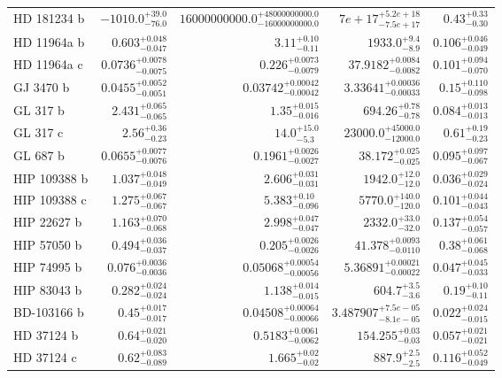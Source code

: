 \begin{longtable*}{lrrrr}
HD 181234 b & $-1010.0^{+39.0}_{-76.0}$ & $16000000000.0^{+48000000000.0}_{-16000000000.0}$ & $7e+17^{+5.2e+18}_{-7.5e+17}$ & $0.43^{+0.33}_{-0.30}$ \\ 
HD 11964a b & $0.603^{+0.048}_{-0.047}$ & $3.11^{+0.10}_{-0.11}$ & $1933.0^{+9.4}_{-8.9}$ & $0.106^{+0.046}_{-0.049}$ \\ 
HD 11964a c & $0.0736^{+0.0078}_{-0.0075}$ & $0.226^{+0.0073}_{-0.0079}$ & $37.9182^{+0.0084}_{-0.0082}$ & $0.101^{+0.094}_{-0.070}$ \\ 
GJ 3470 b & $0.0455^{+0.0052}_{-0.0051}$ & $0.03742^{+0.00042}_{-0.00042}$ & $3.33641^{+0.00036}_{-0.00033}$ & $0.15^{+0.110}_{-0.098}$ \\ 
GL 317 b & $2.431^{+0.065}_{-0.065}$ & $1.35^{+0.015}_{-0.016}$ & $694.26^{+0.78}_{-0.78}$ & $0.084^{+0.013}_{-0.013}$ \\ 
GL 317 c & $2.56^{+0.36}_{-0.23}$ & $14.0^{+15.0}_{-5.3}$ & $23000.0^{+45000.0}_{-12000.0}$ & $0.61^{+0.19}_{-0.23}$ \\ 
GL 687 b & $0.0655^{+0.0077}_{-0.0076}$ & $0.1961^{+0.0026}_{-0.0027}$ & $38.172^{+0.025}_{-0.025}$ & $0.095^{+0.097}_{-0.067}$ \\ 
HIP 109388 b & $1.037^{+0.048}_{-0.049}$ & $2.606^{+0.031}_{-0.031}$ & $1942.0^{+12.0}_{-12.0}$ & $0.036^{+0.029}_{-0.024}$ \\ 
HIP 109388 c & $1.275^{+0.067}_{-0.067}$ & $5.383^{+0.10}_{-0.096}$ & $5770.0^{+140.0}_{-120.0}$ & $0.101^{+0.044}_{-0.043}$ \\ 
HIP 22627 b & $1.163^{+0.070}_{-0.068}$ & $2.998^{+0.047}_{-0.047}$ & $2332.0^{+33.0}_{-32.0}$ & $0.137^{+0.054}_{-0.057}$ \\ 
HIP 57050 b & $0.494^{+0.036}_{-0.037}$ & $0.205^{+0.0026}_{-0.0026}$ & $41.378^{+0.0093}_{-0.0110}$ & $0.38^{+0.061}_{-0.068}$ \\ 
HIP 74995 b & $0.076^{+0.0036}_{-0.0036}$ & $0.05068^{+0.00054}_{-0.00056}$ & $5.36891^{+0.00021}_{-0.00022}$ & $0.047^{+0.045}_{-0.033}$ \\ 
HIP 83043 b & $0.282^{+0.024}_{-0.024}$ & $1.138^{+0.014}_{-0.015}$ & $604.7^{+3.5}_{-3.6}$ & $0.19^{+0.10}_{-0.11}$ \\ 
BD-103166 b & $0.45^{+0.017}_{-0.017}$ & $0.04508^{+0.00064}_{-0.00066}$ & $3.487907^{+7.5e-05}_{-8.1e-05}$ & $0.022^{+0.024}_{-0.015}$ \\ 
HD 37124 b & $0.64^{+0.021}_{-0.020}$ & $0.5183^{+0.0061}_{-0.0062}$ & $154.255^{+0.03}_{-0.03}$ & $0.057^{+0.021}_{-0.021}$ \\ 
HD 37124 c & $0.62^{+0.083}_{-0.089}$ & $1.665^{+0.02}_{-0.02}$ & $887.9^{+2.5}_{-2.5}$ & $0.116^{+0.052}_{-0.049}$ \\ 

\end{longtable*}
